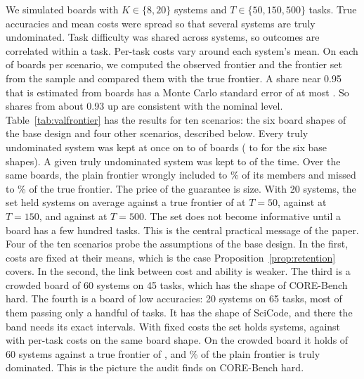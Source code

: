 \documentclass[11pt]{article}
\begin{document}
We simulated boards with $K\in\{8,20\}$ systems and $T\in\{50,150,500\}$ tasks. True accuracies and mean costs were spread so that several systems are truly undominated. Task difficulty was shared across systems, so outcomes are correlated within a task. Per-task costs vary around each system's mean. On each of \NumValR{} boards per scenario, we computed the observed frontier and the frontier set from the sample and compared them with the true frontier. A share near 0.95 that is estimated from \NumValR{} boards has a Monte Carlo standard error of at most \NumValMcSeMax{}. So shares from about 0.93 up are consistent with the nominal level. Table~\ref{tab:valfrontier} has the results for ten scenarios: the six board shapes of the base design and four other scenarios, described below. Every truly undominated system was kept at once on \NumValJointMin{} to \NumValJointMax{} of boards (\NumValBaseJointMin{} to \NumValBaseJointMax{} for the six base shapes). A given truly undominated system was kept \NumValRetentionMin{} to \NumValRetentionMax{} of the time. Over the same boards, the plain frontier wrongly included \NumValNaiveFalseMin{} to \NumValNaiveFalseMax\% of its members and missed \NumValNaiveMissedMin{} to \NumValNaiveMissedMax\% of the true frontier. The price of the guarantee is size. With 20 systems, the set held \NumValSetSizeA{} systems on average against a true frontier of \NumValTrueSizeA{} at $T=50$, \NumValSetSizeB{} against \NumValTrueSizeB{} at $T=150$, and \NumValSetSizeC{} against \NumValTrueSizeC{} at $T=500$. The set does not become informative until a board has a few hundred tasks. This is the central practical message of the paper. Four of the ten scenarios probe the assumptions of the base design. In the first, costs are fixed at their means, which is the case Proposition~\ref{prop:retention} covers. In the second, the link between cost and ability is weaker. The third is a crowded board of 60 systems on 45 tasks, which has the shape of CORE-Bench hard. The fourth is a board of low accuracies: 20 systems on 65 tasks, most of them passing only a handful of tasks. It has the shape of SciCode, and there the band needs its exact intervals. With fixed costs the set holds \NumValSetSizeFixed{} systems, against \NumValSetSizeB{} with per-task costs on the same board shape. On the crowded board it holds \NumValSetSizeSixty{} of 60 systems against a true frontier of \NumValTrueSizeSixty{}, and \NumValNaiveFalseSixty\% of the plain frontier is truly dominated. This is the picture the audit finds on CORE-Bench hard.
\end{document}
